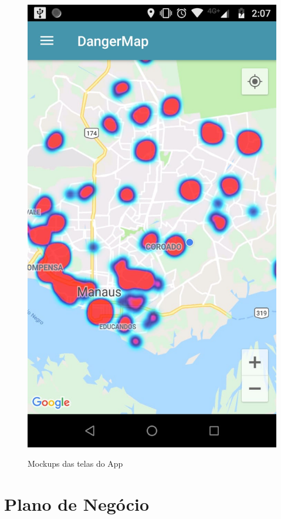 \documentclass[
	12pt,				%
	openright,			%
	twoside,			%
	a4paper,			%
	english,			%
	french,				%
	spanish,			%
	brazil,				%
	]{abntex2}
\begin{document}
\begin{figure}[!htb]
{		\includegraphics[scale=0.19]{figuras/tela-heatmap.jpeg}
		\label{cluster_map}
	}
	\caption{Mockups das telas do App}
	\label{fig01}
\end{figure}



\part{Plano de Negócio}
\end{document}
